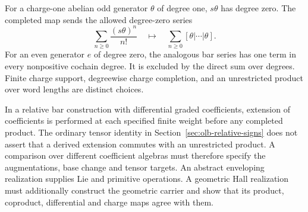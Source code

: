 For a charge-one abelian odd generator $\theta$ of degree one,
$s\theta$ has degree zero.  The completed map sends the
allowed degree-zero series
\[
 \sum_{n\geq0}\frac{(s\theta)^n}{n!}
 \quad\longmapsto\quad
 \sum_{n\geq0}[\theta|\cdots|\theta].
\]
For an even generator $e$ of degree zero, the analogous bar
series has one term in every nonpositive cochain degree.
It is excluded by the direct sum over degrees.
Finite charge support, degreewise charge completion, and an
unrestricted product over word lengths are distinct choices.

In a relative bar construction with differential graded
coefficients, extension of coefficients is performed at each
specified finite weight before any completed product.
The ordinary tensor identity in
Section~\ref{sec:olb-relative-signs} does not assert that a
derived extension commutes with an unrestricted product.
A comparison over different coefficient algebras must therefore specify
the augmentations, base change and tensor targets.
An abstract enveloping realization supplies Lie and primitive
operations.  A geometric Hall realization must additionally
construct the geometric carrier and show that its product,
coproduct, differential and charge maps agree with them.

